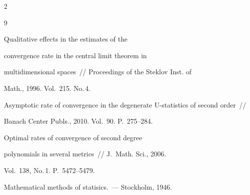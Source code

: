 \begin{multicols}{2}
{{\begin{thebibliography}{9}












Qualitative effects in the estimates of the

convergence rate in the central limit theorem in

multidimensional spaces~// Proceedings of the Steklov Inst. of

      Math., 1996. Vol.~215. No.\,4. 












Asymptotic rate of convergence in the degenerate U-statistics of second order~//

Banach Center Publs., 2010. Vol.~90.  P.~275--284.











Optimal rates of convergence of second degree

polynomials in several metrics~// J.~Math. Sci., 2006.

Vol.~138, No.\,1. P.~5472--5479.





Mathematical methods of statisics.~--- Stockholm, 1946.





\end{thebibliography}

}

}





\end{multicols}



